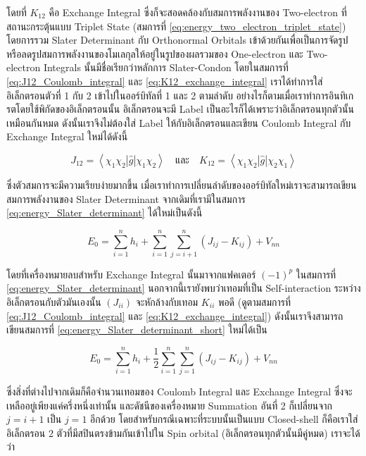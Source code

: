 \noindent โดยที่ $K_{12}$ คือ Exchange Integral ซึ่งก็จะสอดคล้องกับสมการพลังงานของ Two-electron ที่สถานะกระตุ้นแบบ Triplet 
State (สมการที่ \ref{eq:energy_two_electron_triplet_state}) โดยการรวม Slater Determinant กับ Orthonormal Orbitals 
เข้าด้วยกันเพื่อเป็นการจัดรูปหรือลดรูปสมการพลังงานของโมเลกุลให้อยู่ในรูปของผลรวมของ One-electron และ Two-electron Integrals 
นั้นมีชื่อเรียกว่าหลักการ Slater-Condon โดยในสมการที่ \ref{eq:J12_Coulomb_integral} และ \ref{eq:K12_exchange_integral} 
เราได้ทำการใส่อิเล็กตรอนตัวที่ 1 กับ 2 เข้าไปในออร์บิทัลที่ 1 และ 2 ตามลำดับ อย่างไรก็ตามเมื่อเราทำการอินทิเกรตโดยใช้พิกัดของอิเล็กตรอนนั้น%
อิเล็กตรอนจะมี Label เป็นอะไรก็ได้เพราะว่าอิเล็กตรอนทุกตัวนั้นเหมือนกันหมด ดังนั้นเราจึงไม่ต้องใส่ Label ให้กับอิเล็กตรอนและเขียน Coulomb 
Integral กับ Exchange Integral ใหม่ได้ดังนี้

\begin{equation}
    J_{12} = \left\langle\chi_1 \chi_2|\hat{g}| \chi_1 \chi_2\right\rangle 
    \quad \text{และ} \quad 
    K_{12} = \left\langle\chi_1 \chi_2|\hat{g}| \chi_2 \chi_1\right\rangle
\end{equation}

\noindent ซึ่งตัวสมการจะมีความเรียบง่ายมากขึ้น เมื่อเราทำการเปลี่ยนลำดับของออร์บิทัลใหม่เราจะสามารถเขียนสมการพลังงานของ Slater 
Determinant จากเดิมที่เรามีในสมการ \ref{eq:energy_Slater_determinant} ได้ใหม่เป็นดังนี้ 

\begin{equation}
    \label{eq:energy_Slater_determinant_short}
    E_0 = \sum_{i=1}^n h_i 
        + \sum_{i=1}^n \sum_{j=i+1}^n\left(J_{i j}-K_{i j}\right) 
        + V_{n n}
\end{equation}

\noindent โดยที่เครื่องหมายลบสำหรับ Exchange Integral นั้นมาจากแฟคเตอร์ $(-1)^p$ ในสมการที่ \ref{eq:energy_Slater_determinant}
นอกจากนี้เรายังพบว่าเทอมที่เป็น Self-interaction ระหว่างอิเล็กตรอนกับตัวมันเองนั้น $(J_{i i})$ จะหักล้างกับเทอม $K_{i i}$ พอดี 
(ดูตามสมการที่ \ref{eq:J12_Coulomb_integral} และ \ref{eq:K12_exchange_integral}) ดังนั้นเราจึงสามารถเขียนสมการที่ 
\ref{eq:energy_Slater_determinant_short} ใหม่ได้เป็น 

\begin{equation}
    \label{eq:energy_Slater_determinant_reduced}
    E_0 = \sum_{i=1}^n h_i 
        + \frac{1}{2} \sum_{i=1}^n \sum_{j=1}^n\left(J_{i j}-K_{i j}\right) 
        + V_{n n} 
\end{equation}

\noindent ซึ่งสิ่งที่ต่างไปจากเดิมก็คือจำนวนเทอมของ Coulomb Integral และ Exchange Integral ซึ่งจะเหลืออยู่เพียงแค่ครึ่งหนึ่งเท่านั้น%
และดัชนีของเครื่องหมาย Summation อันที่ 2 ก็เปลี่ยนจาก $j=i+1$ เป็น $j=1$ อีกด้วย โดยสำหรับกรณีเฉพาะที่ระบบนั้นเป็นแบบ Closed-shell 
ก็คือเราใส่อิเล็กตรอน 2 ตัวที่มีสปินตรงข้ามกันเข้าไปใน Spin orbital (อิเล็กตรอนทุกตัวนั้นมีคู่หมด) เราจะได้ว่า

